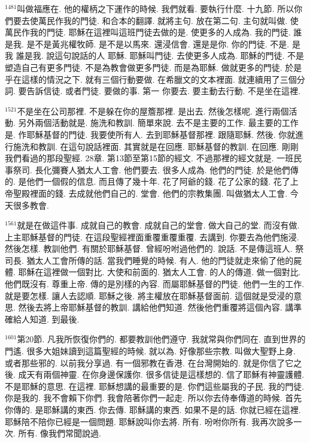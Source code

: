 \documentclass{book}
\begin{document}
$^{1481}$叫做福應在.
他的權柄之下運作的時候.
我們就看.
要執行什麼.
十九節.
所以你們要去使萬民作我的門徒.
和合本的翻譯.
就將主句.
放在第二句.
主句就叫做.
使萬民作我的門徒.
耶穌在這裡叫這班門徒去做的是.
使更多的人成為.
我的門徒.
誰是我.
是不是黃兆權牧師.
是不是以馬來.
還浸信會.
還是是你.
你的門徒.
不是.
是我 誰是我.
說這句說話的人 耶穌.
耶穌叫門徒.
去使更多人成為.
耶穌的門徒.
不是塑造自己有更多門徒.
不是為教會做更多門徒.
而是為耶穌.
做就更多的門徒.
於是乎在這樣的情況之下.
就有三個行動要做.
在希臘文的文本裡面.
就連續用了三個分詞.
要告訴信徒.
或者門徒.
要做的事.
第一 你要去.
要主動去行動.
不是坐在這裡.

$^{1521}$不是坐在公司那裡.
不是躲在你的屋簷那裡.
是出去.
然後怎樣呢.
進行兩個活動.
另外兩個活動就是.
施洗和教訓.
簡單來說.
去不是主要的工作.
最主要的工作是.
作耶穌基督的門徒.
我要使所有人.
去到耶穌基督那裡.
跟隨耶穌.
然後.
你就進行施洗和教訓.
在這句說話裡面.
其實就是在回應.
耶穌基督的教訓.
在回應.
剛剛我們看過的那段聖經.
28章.
第13節至第15節的經文.
不過那裡的經文就是.
一班民事祭司.
長化彌賽人猶太人工會.
他們要去.
很多人成為.
他們的門徒.
於是他們傳的.
是他們一個假的信息.
而且傳了幾十年.
花了阿爺的錢.
花了公家的錢.
花了上帝聖殿裡面的錢.
去成就他們自己的.
堂會.
他們的宗教集團.
叫做猶太人工會.
今天很多教會.

$^{1561}$就是在做這件事.
成就自己的教會.
成就自己的堂會.
做大自己的堂.
而沒有做.
上主耶穌基督的門徒.
在這段聖經裡面重覆重覆重覆.
去講到.
你要去為他們施浸.
然後怎樣.
教訓他們.
有關於耶穌基督.
曾經吩咐過他們的.
說話.
不是傳這班人.
祭司長.
猶太人工會所傳的話.
當我們睡覺的時候.
有人.
他的門徒就走來偷了他的屍體.
耶穌在這裡做一個對比.
大使和前面的.
猶太人工會.
的人的傳道.
做一個對比.
他們既沒有.
尊重上帝.
傳的是別樣的內容.
而屬耶穌基督的門徒.
他們一生的工作.
就是要怎樣.
讓人去認順.
耶穌之後.
將主權放在耶穌基督面前.
這個就是受浸的意思.
然後去將上帝耶穌基督的教訓.
講給他們知道.
然後他們重覆將這個內容.
講準確給人知道.
到最後.

$^{1601}$第20節.
凡我所恢復你們的.
都要教訓他們遵守.
我就常與你們同在.
直到世界的門遙.
很多大姐妹讀到這篇聖經的時候.
就以為.
好像那些宗教.
叫做大聖野上身.
或者那些邪的.
以前我分享過.
有一個邪教在香港.
在台灣開始的.
就是你信了它之後.
成天有兩個神靈.
在你身邊保護你.
很多信徒是這樣想的.
信了耶穌有神靈護體.
不是耶穌的意思.
在這裡.
耶穌想講的最重要的是.
你們這些屬我的子民.
我的門徒.
你是我的.
我不會賴下你們.
我會陪著你們一起走.
所以你去侍奉傳道的時候.
首先你傳的.
是耶穌講的東西.
你去傳.
耶穌講的東西.
如果不是的話.
你就已經在這裡.
耶穌陪不陪你已經是一個問題.
耶穌說叫你去將.
所有.
吩咐你所有.
我再次說多一次.
所有.
像我們常聞說過.
\end{document}
